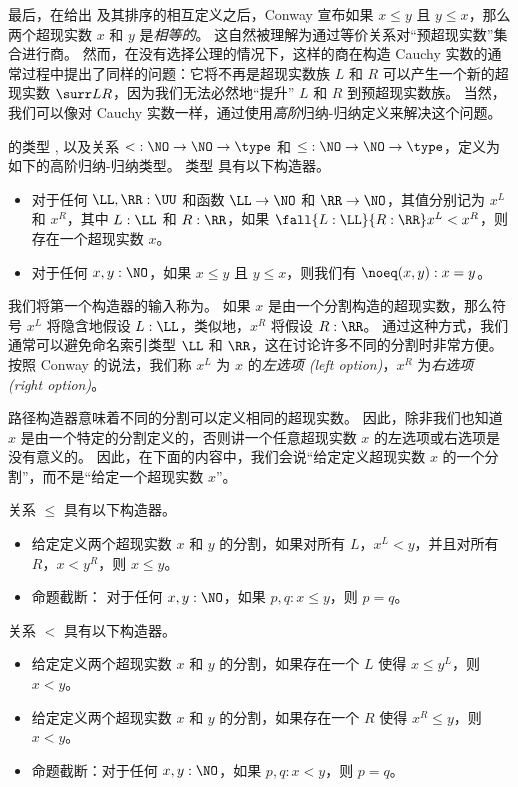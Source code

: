 最后，在给出 \NO 及其排序的相互定义之后，Conway 宣布如果 $x\le y$ 且 $y\le x$，那么两个超现实数 $x$ 和 $y$ 是\emph{相等的}。
这自然被理解为通过等价关系对“预超现实数”集合进行商。
然而，在没有选择公理的情况下，这样的商在构造 Cauchy 实数的通常过程中提出了同样的问题：它将不再是超现实数族 $L$ 和 $R$ 可以产生一个新的超现实数 $\surr L R$，因为我们无法必然地“提升” $L$ 和 $R$ 到预超现实数族。
当然，我们可以像对 Cauchy 实数一样，通过使用\emph{高阶}归纳-归纳定义来解决这个问题。

\begin{defn}\label{defn:surreals}
的类型 \NO,
%
%
以及关系 $\mathord<:\NO\to\NO\to\type$ 和 $\mathord\le:\NO\to\NO\to\type$，定义为如下的高阶归纳-归纳类型。
类型 \NO 具有以下构造器。
\begin{itemize}
  \item 对于任何 $\LL,\RR:\UU$ 和函数 $\LL\to \NO$ 和 $\RR\to \NO$，其值分别记为 $x^L$ 和 $x^R$，其中 $L:\LL$ 和 $R:\RR$，如果 $\fall{L:\LL}{R:\RR} x^L<x^R$，则存在一个超现实数 $x$。
  \item 对于任何 $x,y:\NO$，如果 $x\le y$ 且 $y\le x$，则我们有 $\noeq(x,y):x=y$。
\end{itemize}
我们将第一个构造器的输入称为。
%
如果 $x$ 是由一个分割构造的超现实数，那么符号 $x^L$ 将隐含地假设 $L:\LL$，类似地，$x^R$ 将假设 $R:\RR$。
通过这种方式，我们通常可以避免命名索引类型 $\LL$ 和 $\RR$，这在讨论许多不同的分割时非常方便。
按照 Conway 的说法，我们称 $x^L$ 为 $x$ 的\emph{左选项 (left option)}，$x^R$ 为\emph{右选项 (right option)}。

路径构造器意味着不同的分割可以定义相同的超现实数。
因此，除非我们也知道 $x$ 是由一个特定的分割定义的，否则讲一个任意超现实数 $x$ 的左选项或右选项是没有意义的。
因此，在下面的内容中，我们会说“给定定义超现实数 $x$ 的一个分割”，而不是“给定一个超现实数 $x$”。

关系 $\le$ 具有以下构造器。
%
%
\begin{itemize}
  \item 给定定义两个超现实数 $x$ 和 $y$ 的分割，如果对所有 $L$，$x^L<y$，并且对所有 $R$，$x<y^R$，则 $x\le y$。
  \item 命题截断：
  对于任何 $x,y:\NO$，如果 $p,q:x\le y$，则 $p=q$。
\end{itemize}
关系 $<$ 具有以下构造器。
%
%
\begin{itemize}
  \item 给定定义两个超现实数 $x$ 和 $y$ 的分割，如果存在一个 $L$ 使得 $x\le y^L$，则 $x<y$。
  \item 给定定义两个超现实数 $x$ 和 $y$ 的分割，如果存在一个 $R$ 使得 $x^R\le y$，则 $x<y$。
  \item 命题截断：对于任何 $x,y:\NO$，如果 $p,q:x<y$，则 $p=q$。
\end{itemize}
\end{defn}

